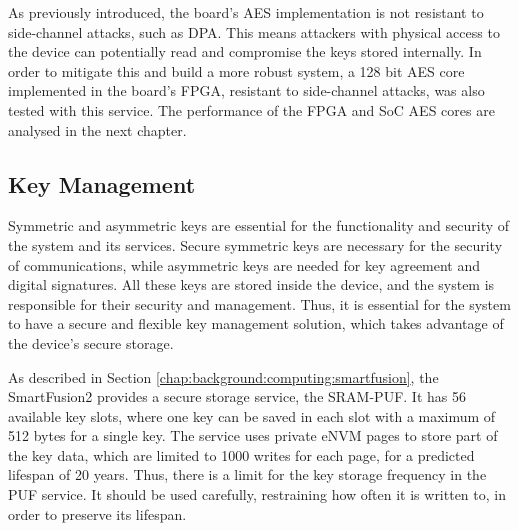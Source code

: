 As previously introduced, the board's AES implementation is not resistant to side-channel attacks, such as DPA. This means attackers with physical access to the device can potentially read and compromise the keys stored internally. In order to mitigate this and build a more robust system, a 128 bit AES core implemented in the board's FPGA, resistant to side-channel attacks, was also tested with this service. The performance of the FPGA and SoC AES cores are analysed in the next chapter.

\subsection{Key Management}\label{chap:implementation:services:key-import}

Symmetric and asymmetric keys are essential for the functionality and security of the system and its services. Secure symmetric keys are necessary for the security of communications, while asymmetric keys are needed for key agreement and digital signatures.
All these keys are stored inside the device, and the system is responsible for their security and management. Thus, it is essential for the system to have a secure and flexible key management solution, which takes advantage of the device's secure storage.

As described in Section \ref{chap:background:computing:smartfusion}, the SmartFusion2 provides a secure storage service, the SRAM-PUF. It has 56 available key slots, where one key can be saved in each slot with a maximum of 512 bytes for a single key.
The service uses private eNVM pages to store part of the key data, which are limited to 1000 writes for each page, for a predicted lifespan of 20 years. Thus, there is a limit for the key storage frequency in the PUF service. It should be used carefully, restraining how often it is written to, in order to preserve its lifespan.

